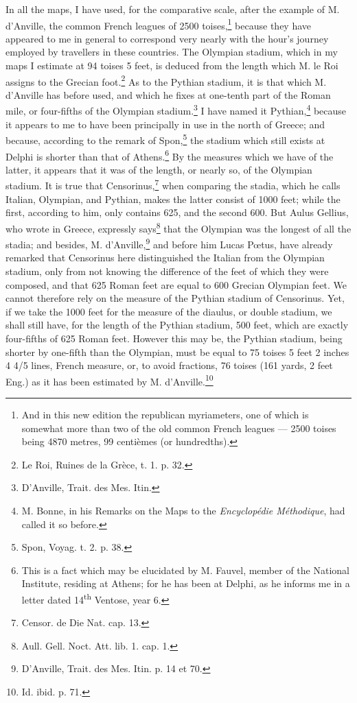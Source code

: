 \documentclass[a4paper, 11pt, oneside, polutonikogreek, english]{article}
\begin{document}
In all the maps, I have used, for the comparative scale, after the example of M. d'Anville, the common French leagues of 2500 toises,\footnote{And in this new edition the republican myriameters, one of which is somewhat more than two of the old common French leagues --- 2500 toises being 4870 metres, 99 centièmes (or hundredths).} because they have appeared to me in general to correspond very nearly with the hour's journey employed by travellers in these countries. The Olympian stadium, which in my maps I estimate at 94 toises 5 feet, is deduced from the length which M. le Roi assigns to the Grecian foot.\footnote{Le Roi, Ruines de la Grèce, t. 1. p. 32.} As to the Pythian stadium, it is that which M. d'Anville has before used, and which he fixes at one-tenth part of the Roman mile, or four-fifths of the Olympian stadium.\footnote{D'Anville, Trait. des Mes. Itin.} I have named it Pythian,\footnote{M. Bonne, in his Remarks on the Maps to the \emph{Encyclopédie Méthodique}, had called it so before.} because it appears to me to have been principally in use in the north of Greece; and because, according to the remark of Spon,\footnote{Spon, Voyag. t. 2. p. 38.} the stadium which still exists at Delphi is shorter than that of Athens.\footnote{This is a fact which may be elucidated by M. Fauvel, member of the National Institute, residing at Athens; for he has been at Delphi, as he informs me in a letter dated 14\textsuperscript{th} Ventose, year 6.} By the measures which we have of the latter, it appears that it was of the length, or nearly so, of the Olympian stadium. It is true that Censorinus,\footnote{Censor. de Die Nat. cap. 13.} when comparing the stadia, which he calls Italian, Olympian, and Pythian, makes the latter consist of 1000 feet; while the first, according to him, only contains 625, and the second 600. But Aulus Gellius, who wrote in Greece, expressly says\footnote{Aull. Gell. Noct. Att. lib. 1. cap. 1.} that the Olympian was the longest of all the stadia; and besides, M. d'Anville,\footnote{D'Anville, Trait. des Mes. Itin. p. 14 et 70.} and before him Lucas Pœtus, have already remarked that Censorinus here distinguished the Italian from the Olympian stadium, only from not knowing the difference of the feet of which they were composed, and that 625 Roman feet are equal to 600 Grecian Olympian feet. We cannot therefore rely on the measure of the Pythian stadium of Censorinus. Yet, if we take the 1000 feet for the measure of the diaulus, or double stadium, we shall still have, for the length of the Pythian stadium, 500 feet, which are exactly four-fifths of 625 Roman feet. However this may be, the Pythian stadium, being shorter by one-fifth than the Olympian, must be equal to 75 toises 5 feet 2 inches 4 4/5 lines, French measure, or, to avoid fractions, 76 toises (161 yards, 2 feet Eng.) as it has been estimated by M. d'Anville.\footnote{Id. ibid. p. 71.}
\end{document}
